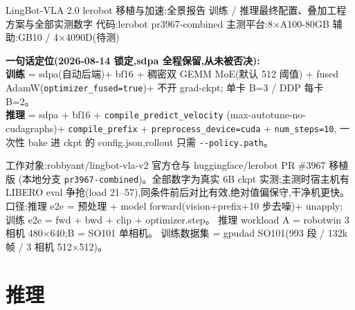 \documentclass[11pt]{ctexart}
\begin{document}
{LingBot-VLA 2.0 lerobot 移植与加速:全景报告}
{训练 / 推理最终配置、叠加工程方案与全部实测数字}
{代码:lerobot pr3967-combined \quad 主测平台:8$\times$A100-80GB \quad 辅助:GB10 / 4$\times$4090D(待测)}

\begin{quotebox}
\textbf{一句话定位(2026-08-14 锁定,sdpa 全程保留,从未被否决):}\\
\textbf{训练} = sdpa(自动后端)+ bf16 + 稠密双 GEMM MoE(默认 512 阈值)\newline
\hspace*{1.2em}+ fused AdamW(\texttt{optimizer\_fused=true})+ 不开 grad-ckpt;
单卡 B=3 / DDP 每卡 B=2。\\
\textbf{推理} = sdpa + bf16 + \texttt{compile\_predict\_velocity}\newline
\hspace*{1.2em}(max-autotune-\newline \hspace*{1.2em}no-cudagraphs)+ \texttt{compile\_prefix}
+ \texttt{preprocess\_device=cuda} + \texttt{num\_steps=10},
一次性 bake 进 ckpt 的 config.json,rollout 只需 \texttt{-{}-policy.path}。
\end{quotebox}

\noindent 工作对象:robbyant/lingbot-vla-v2 官方仓与 huggingface/lerobot PR \#3967 移植版
(本地分支 \texttt{pr3967-combined})。全部数字为真实 6B ckpt 实测;主测时宿主机有
LIBERO eval 争抢(load 21--57),同条件前后对比有效,绝对值偏保守,干净机更快。
口径:推理 e2e = 预处理 + model forward(vision+prefix+10 步去噪)+ unapply;
训练 e2e = fwd + bwd + clip + optimizer.step。
推理 workload A = robotwin 3 相机 480$\times$640;B = SO101 单相机。
训练数据集 = gpudad SO101(993 段 / 132k 帧 / 3 相机 512$\times$512)。

\section{推理}
\end{document}

